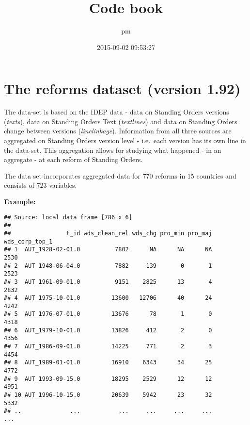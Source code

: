 \documentclass[]{article}
\title{Code book}
\author{pm}
\date{2015-09-02 09:53:27}
\newenvironment{Shaded}{\begin{snugshade}}{\end{snugshade}}
\newcommand{\KeywordTok}[1]{\textcolor[rgb]{0.13,0.29,0.53}{\textbf{{#1}}}}
\newcommand{\StringTok}[1]{\textcolor[rgb]{0.31,0.60,0.02}{{#1}}}
\newcommand{\NormalTok}[1]{{#1}}
\begin{document}
\maketitle

\section{The reforms dataset (version
1.92)}\label{the-reforms-dataset-version-1.92}

The data-set is based on the IDEP data - data on Standing Orders
versions (\emph{texts}), data on Standing Orders Text (\emph{textlines})
and data on Standing Orders change between versions
(\emph{linelinkage}). Information from all three sources are aggregated
on Standing Orders version level - i.e.~each version has its own line in
the data-set. This aggregation allows for studying what happened - in an
aggregate - at each reform of Standing Orders.

The data set incorporates aggregated data for 770 reforms in 15
countries and consists of 723 variables.

\textbf{Example:}

\begin{Shaded}
\end{Shaded}

\begin{verbatim}
## Source: local data frame [786 x 6]
## 
##                t_id wds_clean_rel wds_chg pro_min pro_maj wds_corp_top_1
## 1  AUT_1928-02-01.0          7802      NA      NA      NA           2530
## 2  AUT_1948-06-04.0          7882     139       0       1           2523
## 3  AUT_1961-09-01.0          9151    2825      13       4           2832
## 4  AUT_1975-10-01.0         13600   12706      40      24           4242
## 5  AUT_1976-07-01.0         13676      78       1       0           4318
## 6  AUT_1979-10-01.0         13826     412       2       0           4356
## 7  AUT_1986-09-01.0         14225     771       2       3           4454
## 8  AUT_1989-01-01.0         16910    6343      34      25           4772
## 9  AUT_1993-09-15.0         18295    2529      12      12           4951
## 10 AUT_1996-10-15.0         20639    5942      23      32           5332
## ..              ...           ...     ...     ...     ...            ...
\end{verbatim}
\end{document}
